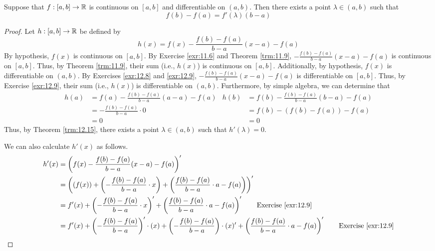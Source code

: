 \documentclass[../main.tex]{subfiles}
\begin{document}
\begin{corollary}\label{cly:12.16}
    Suppose that $f:[a,b]\to\mathbb{R}$ is continuous on $[a,b]$ and differentiable on $(a,b)$. Then there exists a point $\lambda\in(a,b)$ such that
    \begin{equation*}
        f(b)-f(a) = f'(\lambda)(b-a)
    \end{equation*}
    \begin{proof}
        Let $h:[a,b]\to\mathbb{R}$ be defined by
        \begin{equation*}
            h(x) = f(x)-\frac{f(b)-f(a)}{b-a}(x-a)-f(a)
        \end{equation*}
        By hypothesis, $f(x)$ is continuous on $[a,b]$. By Exercise \ref{exr:11.6} and Theorem \ref{trm:11.9}, $-\frac{f(b)-f(a)}{b-a}(x-a)-f(a)$ is continuous on $[a,b]$. Thus, by Theorem \ref{trm:11.9}, their sum (i.e., $h(x)$) is continuous on $[a,b]$. Additionally, by hypothesis, $f(x)$ is differentiable on $(a,b)$. By Exercises \ref{exr:12.8} and \ref{exr:12.9}, $-\frac{f(b)-f(a)}{b-a}(x-a)-f(a)$ is differentiable on $[a,b]$. Thus, by Exercise \ref{exr:12.9}, their sum (i.e., $h(x)$) is differentiable on $(a,b)$. Furthermore, by simple algebra, we can determine that
        \begin{align*}
            h(a) &= f(a)-\frac{f(b)-f(a)}{b-a}(a-a)-f(a)&
                h(b) &= f(b)-\frac{f(b)-f(a)}{b-a}(b-a)-f(a)\\
            &= -\frac{f(b)-f(a)}{b-a}\cdot 0&
                &= f(b)-(f(b)-f(a))-f(a)\\
            &= 0&
                &= 0
        \end{align*}
        Thus, by Theorem \ref{trm:12.15}, there exists a point $\lambda\in(a,b)$ such that $h'(\lambda)=0$.\par
        We can also calculate $h'(x)$ as follows.
        \begin{align*}
            h'(x) &= \left( f(x)-\frac{f(b)-f(a)}{b-a}(x-a)-f(a) \right)'\\
            &= \left( (f(x))+\left( -\frac{f(b)-f(a)}{b-a}\cdot x \right)+\left( \frac{f(b)-f(a)}{b-a}\cdot a-f(a) \right) \right)'\\
            &= f'(x)+\left( -\frac{f(b)-f(a)}{b-a}\cdot x \right)'+\left( \frac{f(b)-f(a)}{b-a}\cdot a-f(a) \right)'\tag*{Exercise \ref{exr:12.9}}\\
            &= f'(x)+\left( -\frac{f(b)-f(a)}{b-a} \right)'\cdot(x)+\left( -\frac{f(b)-f(a)}{b-a} \right)\cdot(x)'+\left( \frac{f(b)-f(a)}{b-a}\cdot a-f(a) \right)'\tag*{Exercise \ref{exr:12.9}}\\

\end{align*}
\end{proof}
\end{corollary}
\end{document}
